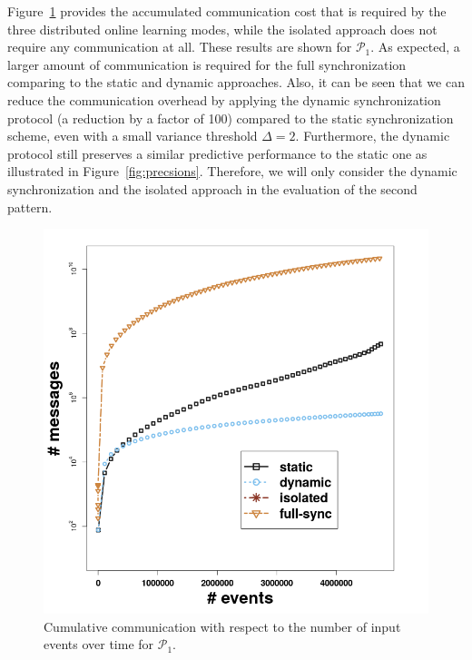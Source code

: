 \par Figure~\ref{fig:comm} provides the accumulated communication cost that is required by the three distributed online learning modes, while the isolated approach does not require any communication at all. These results are shown for $\mathcal{P}_1$.  As expected, a larger amount of communication is required for the full synchronization comparing to the static and dynamic approaches. Also, it can be seen that we can reduce the communication overhead by applying the dynamic synchronization protocol (a reduction by a factor of 100) compared to the static synchronization scheme, even with a small variance threshold $\Delta=2$. Furthermore, the dynamic  protocol still preserves a similar predictive performance to the static one as illustrated in Figure~\ref{fig:precsions}.  Therefore, we will only consider the dynamic synchronization and the isolated approach in the evaluation of the second pattern.

\begin{center}
	
	\begin{figure}[H]
		\centering
		\includegraphics[width=\textwidth,height=.62\textheight]{chapters/figures/synopses/p1_messages_100_2_08.png}
		
		\caption{Cumulative communication with respect to the number of input events over time for $\mathcal{P}_1$.}
		\label{fig:comm}
	\end{figure}
\end{center}

